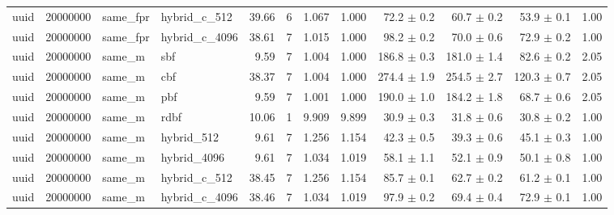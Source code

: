 \begin{tabular}{llllrrrrrrrr}
uuid & 20000000 & same\_fpr & hybrid\_c\_512 & 39.66 & 6 & 1.067 & 1.000 & 72.2 $\pm$ 0.2 & 60.7 $\pm$ 0.2 & 53.9 $\pm$ 0.1 & 1.00 \\
uuid & 20000000 & same\_fpr & hybrid\_c\_4096 & 38.61 & 7 & 1.015 & 1.000 & 98.2 $\pm$ 0.2 & 70.0 $\pm$ 0.6 & 72.9 $\pm$ 0.2 & 1.00 \\
uuid & 20000000 & same\_m & sbf & 9.59 & 7 & 1.004 & 1.000 & 186.8 $\pm$ 0.3 & 181.0 $\pm$ 1.4 & 82.6 $\pm$ 0.2 & 2.05 \\
uuid & 20000000 & same\_m & cbf & 38.37 & 7 & 1.004 & 1.000 & 274.4 $\pm$ 1.9 & 254.5 $\pm$ 2.7 & 120.3 $\pm$ 0.7 & 2.05 \\
uuid & 20000000 & same\_m & pbf & 9.59 & 7 & 1.001 & 1.000 & 190.0 $\pm$ 1.0 & 184.2 $\pm$ 1.8 & 68.7 $\pm$ 0.6 & 2.05 \\
uuid & 20000000 & same\_m & rdbf & 10.06 & 1 & 9.909 & 9.899 & 30.9 $\pm$ 0.3 & 31.8 $\pm$ 0.6 & 30.8 $\pm$ 0.2 & 1.00 \\
uuid & 20000000 & same\_m & hybrid\_512 & 9.61 & 7 & 1.256 & 1.154 & 42.3 $\pm$ 0.5 & 39.3 $\pm$ 0.6 & 45.1 $\pm$ 0.3 & 1.00 \\
uuid & 20000000 & same\_m & hybrid\_4096 & 9.61 & 7 & 1.034 & 1.019 & 58.1 $\pm$ 1.1 & 52.1 $\pm$ 0.9 & 50.1 $\pm$ 0.8 & 1.00 \\
uuid & 20000000 & same\_m & hybrid\_c\_512 & 38.45 & 7 & 1.256 & 1.154 & 85.7 $\pm$ 0.1 & 62.7 $\pm$ 0.2 & 61.2 $\pm$ 0.1 & 1.00 \\
uuid & 20000000 & same\_m & hybrid\_c\_4096 & 38.46 & 7 & 1.034 & 1.019 & 97.9 $\pm$ 0.2 & 69.4 $\pm$ 0.4 & 72.9 $\pm$ 0.1 & 1.00 \\
\bottomrule
\end{tabular}
